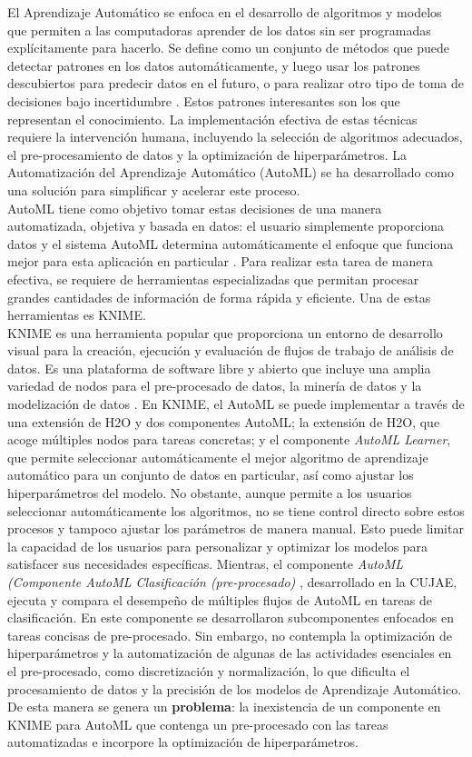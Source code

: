 El Aprendizaje Automático se enfoca en el desarrollo de algoritmos y modelos que permiten a las computadoras aprender de los datos sin ser programadas explícitamente para hacerlo. Se define como un conjunto de métodos que puede detectar patrones en los datos automáticamente, y luego usar los patrones descubiertos para predecir datos en el futuro, o para realizar otro tipo de toma de decisiones bajo incertidumbre \citep{murphy2012machine}. Estos patrones interesantes son los que representan el conocimiento. La implementación efectiva de estas técnicas requiere la intervención humana, incluyendo la selección de algoritmos adecuados, el pre-procesamiento de datos y la optimización de hiperparámetros. La Automatización del Aprendizaje Automático (AutoML) se ha desarrollado como una solución para simplificar y acelerar este proceso. \\
 AutoML tiene como objetivo tomar estas decisiones de una manera automatizada, objetiva y basada en datos: el usuario simplemente proporciona datos y el sistema AutoML determina automáticamente el enfoque que funciona mejor para esta aplicación en particular \citep{hutter2019automated}. Para realizar esta tarea de manera efectiva, se requiere de herramientas especializadas que permitan procesar grandes cantidades de información de forma rápida y eficiente. Una de estas herramientas es KNIME.\\
KNIME es una herramienta popular que proporciona un entorno de desarrollo visual para la creación, ejecución y evaluación de flujos de trabajo de análisis de datos. Es una plataforma de software libre y abierto que incluye una amplia variedad de nodos para el pre-procesado de datos, la minería de datos y la modelización de datos \citep{knime2023}. En KNIME, el AutoML se puede implementar a través de una extensión de H2O y dos componentes AutoML; la extensión de H2O, que acoge múltiples nodos para tareas concretas; y el componente \textit{AutoML Learner}, que permite seleccionar automáticamente el mejor algoritmo de aprendizaje automático para un conjunto de datos en particular, así como ajustar los hiperparámetros del modelo. No obstante, aunque permite a los usuarios seleccionar automáticamente los algoritmos, no se tiene control directo sobre estos procesos y tampoco ajustar los parámetros de manera manual. Esto puede limitar la capacidad de los usuarios para personalizar y optimizar los modelos para satisfacer sus necesidades específicas. Mientras, el componente \textit{AutoML (Componente AutoML Clasificación (pre-procesado)} \citep{Carrazana2022}, desarrollado en la CUJAE, ejecuta y compara el desempeño de múltiples flujos de AutoML en tareas de clasificación. En este componente se desarrollaron subcomponentes enfocados en tareas concisas de pre-procesado. Sin embargo, no contempla la optimización de hiperparámetros y la automatización de algunas de las actividades esenciales en el pre-procesado, como discretización y normalización, lo que dificulta el procesamiento de datos y la precisión de los modelos de Aprendizaje Automático. De esta manera se genera un \textbf{problema}: la inexistencia de un componente en KNIME para AutoML que contenga un pre-procesado con las tareas automatizadas e incorpore la optimización de hiperparámetros. \\
